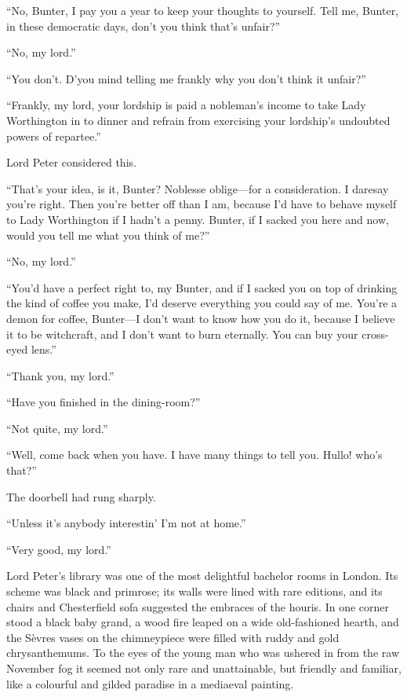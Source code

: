 \enquote{No, Bunter, I pay you  a year to keep your thoughts to yourself. Tell me, Bunter, in these democratic days, don’t you think that’s unfair?}

\enquote{No, my lord.}

\enquote{You don’t. D’you mind telling me frankly why you don’t think it unfair?}

\enquote{Frankly, my lord, your lordship is paid a nobleman’s income to take Lady Worthington in to dinner and refrain from exercising your lordship’s undoubted powers of repartee.}

Lord Peter considered this.

\enquote{That’s your idea, is it, Bunter? Noblesse oblige\allowbreak---\allowbreak for a consideration. I daresay you’re right. Then you’re better off than I am, because I’d have to behave myself to Lady Worthington if I hadn’t a penny. Bunter, if I sacked you here and now, would you tell me what you think of me?}

\enquote{No, my lord.}

\enquote{You’d have a perfect right to, my Bunter, and if I sacked you on top of drinking the kind of coffee you make, I’d deserve everything you could say of me. You’re a demon for coffee, Bunter\allowbreak---\allowbreak I don’t want to know how you do it, because I believe it to be witchcraft, and I don’t want to burn eternally. You can buy your cross-eyed lens.}

\enquote{Thank you, my lord.}

\enquote{Have you finished in the dining-room?}

\enquote{Not quite, my lord.}

\enquote{Well, come back when you have. I have many things to tell you. Hullo! who’s that?}

The doorbell had rung sharply.

\enquote{Unless it’s anybody interestin’ I’m not at home.}

\enquote{Very good, my lord.}

Lord Peter’s library was one of the most delightful bachelor rooms in London. Its scheme was black and primrose; its walls were lined with rare editions, and its chairs and Chesterfield sofa suggested the embraces of the houris. In one corner stood a black baby grand, a wood fire leaped on a wide old-fashioned hearth, and the Sèvres vases on the chimneypiece were filled with ruddy and gold chrysanthemums. To the eyes of the young man who was ushered in from the raw November fog it seemed not only rare and unattainable, but friendly and familiar, like a colourful and gilded paradise in a mediaeval painting.


